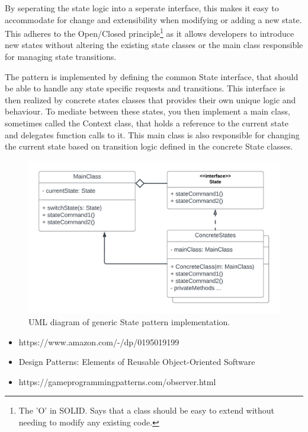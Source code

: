     By seperating the state logic into a seperate interface, this makes it easy to accommodate for change and extensibility when modifying or adding a new state. This adheres to the Open/Closed principle\footnote{The 'O' in SOLID. Says that a class should be easy to extend without needing to modify any existing code.} as it allows developers to introduce new states without altering the existing state classes or the main class responsible for managing state transitions.

    The pattern is implemented by defining the common State interface, that should be able to handle any state specific requests and transitions. This interface is then realized by concrete states classes that provides their own unique logic and behaviour. To mediate between these states, you then implement a main class, sometimes called the Context class, that holds a reference to the current state and delegates function calls to it. This main class is also responsible for changing the current state based on transition logic defined in the concrete State classes.
    
    \begin{figure}[H]
      \centering
      \includegraphics[scale=0.75]{Project_report/figures/theory/design_patterns/state_uml.png}
      \caption{UML diagram of generic State pattern implementation.}
      \label{fig:observer_uml}
    \end{figure}

    \vspace{50pt}
    \begin{itemize}
        \item https://www.amazon.com/-/dp/0195019199
        \item Design Patterns: Elements of Reusable Object-Oriented Software
        \item https://gameprogrammingpatterns.com/observer.html
    \end{itemize}


